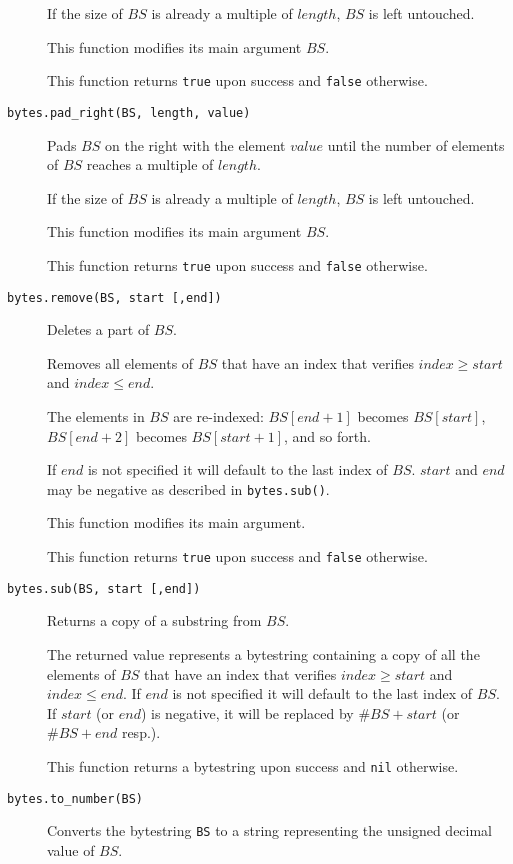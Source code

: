 \documentclass[11pt]{article}
\begin{document}
\begin{description}
{  If the size of $BS$ is already a multiple of $length$, $BS$ is left untouched.

  This function modifies its main argument $BS$.
  
  This function returns \texttt{true} upon success and \texttt{false} otherwise.
}

\item[\texttt{bytes.pad\_right(BS, length, value)}]
{
  Pads $BS$ on the right with the element $value$ until the number of elements 
  of $BS$ reaches a multiple of $length$.

  If the size of $BS$ is already a multiple of $length$, $BS$ is left untouched.

  This function modifies its main argument $BS$.
  
  This function returns \texttt{true} upon success and \texttt{false} otherwise.
}

\item[\texttt{bytes.remove(BS, start [,end])}]
{
  Deletes a part of $BS$.

  Removes all elements of $BS$ that have an index that verifies 
  $index \geq start$ and $index \leq end$.

  The elements in $BS$ are re-indexed: $BS[end+1]$ becomes $BS[start]$,
  $BS[end+2]$ becomes $BS[start+1]$, and so forth.

  If $end$ is not specified it will default to the last index of $BS$.
  $start$ and $end$ may be negative as described in \texttt{bytes.sub()}.

  This function modifies its main argument.
  
  This function returns \texttt{true} upon success and \texttt{false} otherwise.
}

\item[\texttt{bytes.sub(BS, start [,end])}]
{
  Returns a copy of a substring from $BS$.

  The returned value represents a bytestring containing a copy of all the 
  elements of $BS$ that have an index that verifies $index \geq start$ and 
  $index \leq end$.
  If $end$ is not specified it will default to the last index of $BS$.
  If $start$ (or $end$) is negative, it will be replaced by $\#BS+start$
  (or $\#BS+end$ resp.).

  This function returns a bytestring upon success and \texttt{nil} otherwise.
}

\item[\texttt{bytes.to\_number(BS)}]
{
  Converts the bytestring \texttt{BS} to a string representing the unsigned 
  decimal value of $BS$.

}
\end{description}
\end{document}
